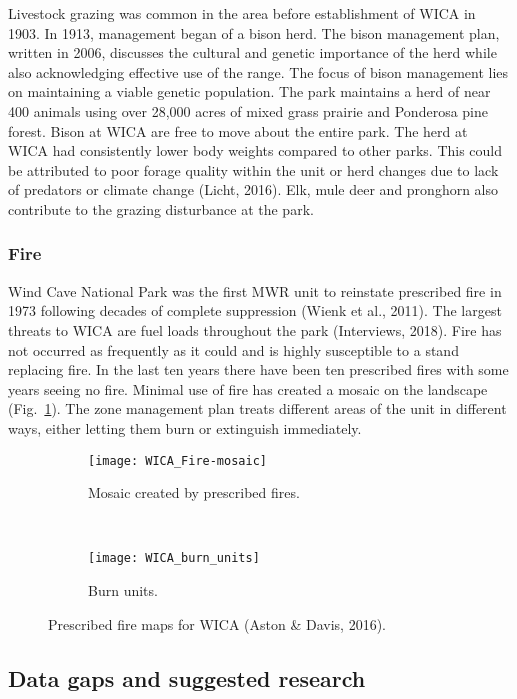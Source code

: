 Livestock grazing was common in the area before establishment of WICA in 1903. 
In 1913, management began of a bison herd. 
The bison management plan, written in 2006, discusses the cultural and genetic importance of the herd while also acknowledging effective use of the range. 
The focus of bison management lies on maintaining a viable genetic population. 
The park maintains a herd of near 400 animals using over 28,000 acres of mixed grass prairie and Ponderosa pine forest. 
Bison at WICA are free to move about the entire park. 
The herd at WICA had consistently lower body weights compared to other parks. 
This could be attributed to poor forage
quality within the unit or herd changes due to lack of predators or climate change (Licht, 2016). 
Elk, mule deer and pronghorn also contribute to the grazing disturbance at the park.

\subsubsection{Fire }

Wind Cave National Park was the first MWR unit to reinstate prescribed fire in 1973 following decades of complete suppression (Wienk et al., 2011). 
The largest threats to WICA are fuel loads throughout the park (Interviews, 2018). 
Fire has not occurred as frequently as it could and is highly susceptible to a stand replacing fire. 
In the last ten years there have been ten prescribed fires with some years seeing no fire.
Minimal use of fire has created a mosaic on the landscape (Fig.~\ref{fig:WICAmosaic}).
The zone management plan treats different areas of the unit in different
ways, either letting them burn or extinguish immediately.

\begin{figure}[]
	\centering
	\begin{subfigure}[t]{0.5\textwidth}
		\centering
		\texttt{[image: WICA\_Fire-mosaic]}
		\caption{Mosaic created by prescribed fires.}
		\label{fig:WICAmosaic}
	\end{subfigure}%
	~ 
	\begin{subfigure}[t]{0.5\textwidth}
		\centering
		\texttt{[image: WICA\_burn\_units]}
		\caption{Burn units.}
		\label{fig:WICAunits}
	\end{subfigure}
	\caption[WICA fire maps]{Prescribed fire maps for WICA (Aston \& Davis,
		2016).}
\end{figure}

\subsection{Data gaps and suggested research}

